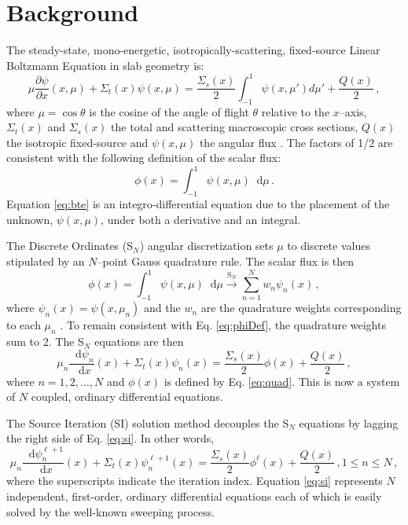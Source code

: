 \documentclass{anstrans}
\newcommand{\SN}{S$_N$\xspace}
\newcommand{\ud}{\mathop{}\!\mathrm{d}} %
\newcommand{\pderiv}[2]{\frac{\partial #1}{\partial #2}}
\newcommand{\dderiv}[2]{\frac{\ud #1}{\ud #2}}
\begin{document}
\section{Background}
	The steady-state, mono-energetic, isotropically-scattering, fixed-source Linear Boltzmann Equation in slab geometry is: 
		\begin{equation} \label{eq:bte}
			\mu \pderiv{\psi}{x}(x, \mu) + \Sigma_t(x) \psi(x,\mu) = 
			\frac{\Sigma_s(x)}{2} \int_{-1}^{1} \psi(x, \mu') d\mu' + \frac{Q(x)}{2} \,,
		\end{equation}
	where $\mu = \cos\theta$ is the cosine of the angle of flight $\theta$ relative to the $x$--axis, $\Sigma_t(x)$ and $\Sigma_s(x)$ the total and scattering macroscopic cross sections, $Q(x)$ the isotropic fixed-source and $\psi(x, \mu)$ the angular flux \cite{adams}. The factors of 1/2 are consistent with the following definition of the scalar flux:
		\begin{equation} \label{eq:phiDef}
			\phi(x) = \int_{-1}^1 \psi(x, \mu) \ud \mu \,.
		\end{equation}
	Equation \ref{eq:bte} is an integro-differential equation due to the placement of the unknown, $\psi(x,\mu)$, under both a derivative and an integral.

	The Discrete Ordinates (\SN) angular discretization sets $\mu$ to discrete values stipulated by an $N$--point Gauss quadrature rule. The scalar flux is then 
		\begin{equation} \label{eq:quad}
			\phi(x) = \int_{-1}^1 \psi(x, \mu) \ud\mu 
				\xrightarrow{\text{S}_N} \sum_{n=1}^N w_n \psi_n(x) \,,
		\end{equation}
	where $\psi_n(x) = \psi(x,\mu_n)$ and the $w_n$ are the quadrature weights corresponding to each $\mu_n$ \cite{llnl}. To remain consistent with Eq. \ref{eq:phiDef}, the quadrature weights sum to 2. The \SN equations are then 
		\begin{equation} \label{eq:sn}
			\mu_n \dderiv{\psi_n}{x}(x) + \Sigma_t(x) \psi_n(x) = 
			\frac{\Sigma_s(x)}{2} \phi(x) + \frac{Q(x)}{2} \,, 
		\end{equation}
	where $n = 1, 2, \dots, N$ and $\phi(x)$ is defined by Eq. \ref{eq:quad}. This is now a system of $N$ coupled, ordinary differential equations. 

	The Source Iteration (SI) solution method decouples the \SN equations by lagging the right side of Eq. \ref{eq:si}. In other words, 
		\begin{equation} \label{eq:si}
			\mu_n \dderiv{\psi_n^{\ell+1}}{x}(x) + \Sigma_t(x) \psi_n^{\ell+1}(x) = 
			\frac{\Sigma_s(x)}{2} \phi^{\ell}(x) + \frac{Q(x)}{2} \,, 1 \leq n \leq N \,,
		\end{equation}
	where the superscripts indicate the iteration index. 
	Equation \ref{eq:si} represents $N$ independent, first-order, ordinary differential equations each of which is easily solved by the well-known sweeping process. 
\end{document}
